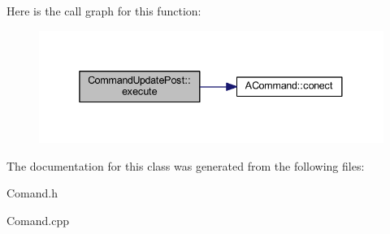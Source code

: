 Here is the call graph for this function\-:\nopagebreak
\begin{figure}[H]
\begin{center}
\leavevmode
\includegraphics[width=338pt]{class_command_update_post_a478d3f5f2bd985e18d7dc9f4b7dda74a_cgraph}
\end{center}
\end{figure}




The documentation for this class was generated from the following files\-:\begin{DoxyCompactItemize}
\item 
Comand.\-h\item 
Comand.\-cpp\end{DoxyCompactItemize}
